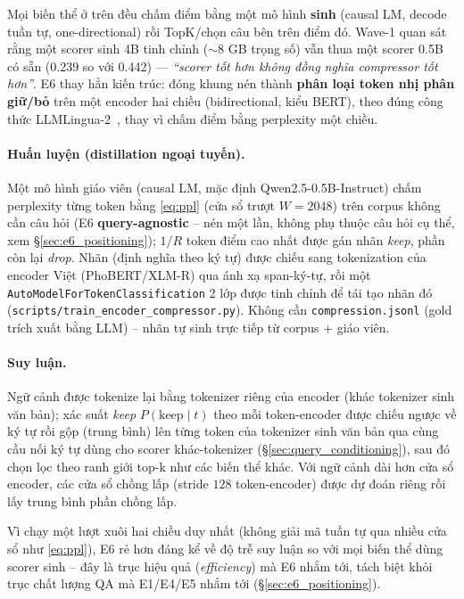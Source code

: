\documentclass[12pt,a4paper]{article}
\begin{document}
Mọi biến thể ở trên đều chấm điểm bằng một mô hình \textbf{sinh} (causal LM, decode tuần tự, one-directional) rồi TopK/chọn câu bên trên điểm đó. Wave-1 quan sát rằng một scorer sinh 4B tinh chỉnh ($\sim$8 GB trọng số) vẫn thua một scorer 0.5B có sẵn (0.239 so với 0.442) --- \textit{``scorer tốt hơn không đồng nghĩa compressor tốt hơn''}. E6 thay hẳn kiến trúc: đóng khung nén thành \textbf{phân loại token nhị phân giữ/bỏ} trên một encoder hai chiều (bidirectional, kiểu BERT), theo đúng công thức LLMLingua-2~\cite{pan2024llmlingua2}, thay vì chấm điểm bằng perplexity một chiều.

\paragraph{Huấn luyện (distillation ngoại tuyến).} Một mô hình giáo viên (causal LM, mặc định Qwen2.5-0.5B-Instruct) chấm perplexity từng token bằng \eqref{eq:ppl} (cửa sổ trượt $W{=}2048$) trên corpus không cần câu hỏi (E6 \textbf{query-agnostic} -- nén một lần, không phụ thuộc câu hỏi cụ thể, xem \S\ref{sec:e6_positioning}); $1/R$ token điểm cao nhất được gán nhãn \textit{keep}, phần còn lại \textit{drop}. Nhãn (định nghĩa theo ký tự) được chiếu sang tokenization của encoder Việt (PhoBERT/XLM-R) qua ánh xạ span-ký-tự, rồi một \texttt{AutoModelForTokenClassification} 2 lớp được tinh chỉnh để tái tạo nhãn đó (\texttt{scripts/train\_encoder\_compressor.py}). Không cần \texttt{compression.jsonl} (gold trích xuất bằng LLM) -- nhãn tự sinh trực tiếp từ corpus + giáo viên.

\paragraph{Suy luận.} Ngữ cảnh được tokenize lại bằng tokenizer riêng của encoder (khác tokenizer sinh văn bản); xác suất \textit{keep} $P(\text{keep} \mid t)$ theo mỗi token-encoder được chiếu ngược về ký tự rồi gộp (trung bình) lên từng token của tokenizer sinh văn bản qua cùng cầu nối ký tự dùng cho scorer khác-tokenizer (\S\ref{sec:query_conditioning}), sau đó chọn lọc theo ranh giới top-k như các biến thể khác. Với ngữ cảnh dài hơn cửa sổ encoder, các cửa sổ chồng lấp (stride $128$ token-encoder) được dự đoán riêng rồi lấy trung bình phần chồng lấp.

Vì chạy một lượt xuôi hai chiều duy nhất (không giải mã tuần tự qua nhiều cửa sổ như \eqref{eq:ppl}), E6 rẻ hơn đáng kể về độ trễ suy luận so với mọi biến thể dùng scorer sinh -- đây là trục hiệu quả (\textit{efficiency}) mà E6 nhắm tới, tách biệt khỏi trục chất lượng QA mà E1/E4/E5 nhắm tới (\S\ref{sec:e6_positioning}).
\end{document}
